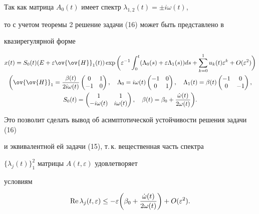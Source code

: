 \begin{examnonum}
Так как матрица $A_0(t)$ имеет спектр $\lambda_{1,2}(t)=\pm i\omega(t)$,


то с учетом теоремы 2 решение задачи (16) может быть представлено в 


квазирегулярной форме


\begin{gather*}


x(t)=S_0(t)(E+\varepsilon\ov{\ov{H}}_1(t))\exp


\bigg(\varepsilon^{-1}\int^{t}_{0}(\Lambda_0(s)+\varepsilon\Lambda_1(s))ds+


\sum^{1}_{k=0}u_k(t)\varepsilon^k+O(\varepsilon^2)\bigg) \\


%


\bigg(\ov{\ov{H}}_1=\frac{\beta(t)}{2i\omega(t)}\begin{pmatrix}


0& 1 \\ -1& 0 \end{pmatrix},\quad


\Lambda_0=i\omega(t)\begin{pmatrix}


-1& 0 \\ 0& 1 \end{pmatrix},\quad


\Lambda_1(t)=\beta(t) \begin{pmatrix}


-1& 0 \\ 0& -1 \end{pmatrix},\\


%


S_0(t)= \begin{pmatrix}


1& 1 \\ -i\omega(t)& i\omega(t) \end{pmatrix},\quad


\beta(t)=\beta_0+\frac{\dot{\omega}(t)}{2\omega(t)}\bigg).


\end{gather*}


Это позволит сделать вывод об асимптотической устойчивости решения задачи (16) 


и эквивалентной ей задачи (15), т.\,к. вещественная часть спектра


$\{\lambda_j(t) \}_1^2$ матрицы $ A(t,\varepsilon) $ удовлетворяет 


условиям


$$


\re\lambda_j(t,\varepsilon)\leq -\varepsilon \bigg(\beta_0+


\frac{\Dot{\omega}(t)}{2\omega(t)} \bigg)+O(\varepsilon^2).


$$


\end{examnonum}





